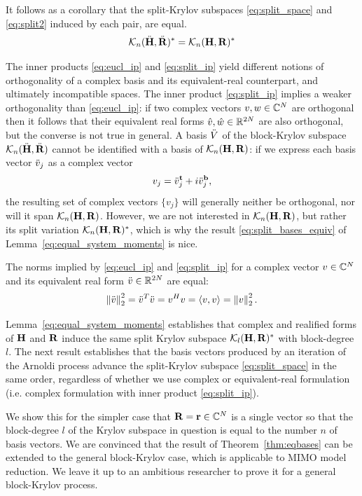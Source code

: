 It follows as a corollary that the split-Krylov subspaces \eqref{eq:split_space} and \eqref{eq:split2}  induced by each pair, are equal.
\begin{equation}
	   	\krylov{n}{\Heq}{\Req}^* = \krylov{n}{\H}{\RR}^*
\label{eq:split_bases_equiv}
\end{equation}



The inner products \eqref{eq:eucl_ip} and \eqref{eq:split_ip} yield
different notions of orthogonality of a complex basis
and its equivalent-real counterpart, and ultimately incompatible spaces.  The inner product
\eqref{eq:split_ip} implies a weaker orthogonality than \eqref{eq:eucl_ip}:
if two complex vectors $v,w\in\mathbb{C}^N$ are orthogonal then it follows that their
equivalent real forms $\hat{v},\hat{w}\in\mathbb{R}^{2N}$ are also orthogonal, but the converse
is not true in general.
A basis $\ddot{V}$ of the block-Krylov subspace $\mathcal{K}_{n}({{\ddot{\textbf{\textup{H}}}}},{{\ddot{\textbf{\textup{R}}}}})$ cannot be
identified with a basis of $\mathcal{K}_{n}({\textbf{\textup{H}}},{\textbf{\textup{R}}})$:  if
we express each basis vector $\ddot{v}_j$ as a complex vector
\[
v_j = \ddot{v}^{\mathrm{\bf{t}}}_{j} + i\ddot{v}^{\mathrm{\bf{b}}}_{j},
\]
the resulting set of complex vectors $\{v_j\}$ will generally neither be orthogonal,
nor will it span $\mathcal{K}_{n}({\textbf{\textup{H}}},{\textbf{\textup{R}}})$.  However, we are not interested
in $\mathcal{K}_{n}({\textbf{\textup{H}}},{\textbf{\textup{R}}})$, but rather its split variation $\mathcal{K}_{n}({\textbf{\textup{H}}},{\textbf{\textup{R}}})^*$,
which is why the result \eqref{eq:split_bases_equiv} of Lemma~\ref{eq:equal_system_moments} is nice.

The norms implied by \eqref{eq:eucl_ip} and \eqref{eq:split_ip}  for a complex vector $v\in\mathbb{C}^N$ and its equivalent real form $\ddot{v}\in\mathbb{R}^{2N}$ are equal:
\begin{equation}
\nrm{2}{\veq}^2 = \veq^T \veq  = \c{v}v =  \ipr{v}{v} = \nrm{2}{v}^2 .
\label{eq:equiv_norms}
\end{equation}


Lemma~\ref{eq:equal_system_moments} establishes that complex and realified forms of $\textbf{\textup{H}}$ and $\textbf{\textup{R}}$ induce the same split Krylov subspace $\mathcal{K}_{l}({\textbf{\textup{H}}},{\textbf{\textup{R}}})^*$ with block-degree $l$.  The next result establishes that the basis vectors produced by an iteration
of the Arnoldi process advance the split-Krylov subspace \eqref{eq:split_space} in the same order, regardless of whether we use complex or equivalent-real formulation (i.e. complex formulation with inner product \eqref{eq:split_ip}).

We show this for the simpler case that $\textbf{\textup{R}}=\textbf{\textup{r}}\in\mathbb{C}^N$ is a single vector so that the block-degree $l$ of the Krylov subspace in question is equal to the number $n$ of basis vectors.  We are convinced that  the result of Theorem~\ref{thm:eqbases} can be extended to the general block-Krylov case, which is applicable to MIMO model reduction. We leave it up to an ambitious researcher to prove it for a general  block-Krylov process.

